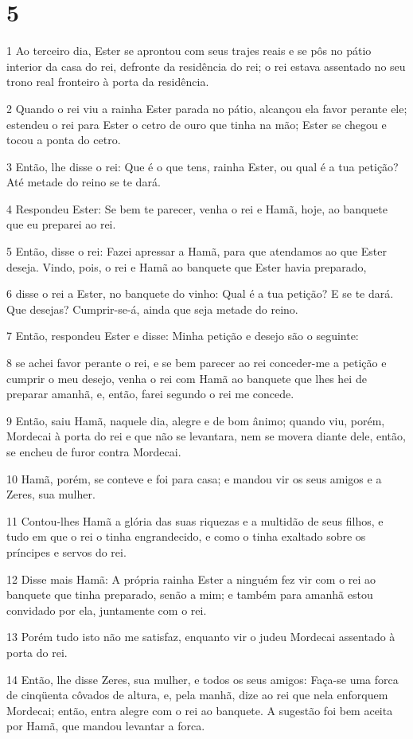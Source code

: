 \chapter{5}

\par 1 Ao terceiro dia, Ester se aprontou com seus trajes reais e se pôs no pátio interior da casa do rei, defronte da residência do rei; o rei estava assentado no seu trono real fronteiro à porta da residência.
\par 2 Quando o rei viu a rainha Ester parada no pátio, alcançou ela favor perante ele; estendeu o rei para Ester o cetro de ouro que tinha na mão; Ester se chegou e tocou a ponta do cetro.
\par 3 Então, lhe disse o rei: Que é o que tens, rainha Ester, ou qual é a tua petição? Até metade do reino se te dará.
\par 4 Respondeu Ester: Se bem te parecer, venha o rei e Hamã, hoje, ao banquete que eu preparei ao rei.
\par 5 Então, disse o rei: Fazei apressar a Hamã, para que atendamos ao que Ester deseja. Vindo, pois, o rei e Hamã ao banquete que Ester havia preparado,
\par 6 disse o rei a Ester, no banquete do vinho: Qual é a tua petição? E se te dará. Que desejas? Cumprir-se-á, ainda que seja metade do reino.
\par 7 Então, respondeu Ester e disse: Minha petição e desejo são o seguinte:
\par 8 se achei favor perante o rei, e se bem parecer ao rei conceder-me a petição e cumprir o meu desejo, venha o rei com Hamã ao banquete que lhes hei de preparar amanhã, e, então, farei segundo o rei me concede.
\par 9 Então, saiu Hamã, naquele dia, alegre e de bom ânimo; quando viu, porém, Mordecai à porta do rei e que não se levantara, nem se movera diante dele, então, se encheu de furor contra Mordecai.
\par 10 Hamã, porém, se conteve e foi para casa; e mandou vir os seus amigos e a Zeres, sua mulher.
\par 11 Contou-lhes Hamã a glória das suas riquezas e a multidão de seus filhos, e tudo em que o rei o tinha engrandecido, e como o tinha exaltado sobre os príncipes e servos do rei.
\par 12 Disse mais Hamã: A própria rainha Ester a ninguém fez vir com o rei ao banquete que tinha preparado, senão a mim; e também para amanhã estou convidado por ela, juntamente com o rei.
\par 13 Porém tudo isto não me satisfaz, enquanto vir o judeu Mordecai assentado à porta do rei.
\par 14 Então, lhe disse Zeres, sua mulher, e todos os seus amigos: Faça-se uma forca de cinqüenta côvados de altura, e, pela manhã, dize ao rei que nela enforquem Mordecai; então, entra alegre com o rei ao banquete. A sugestão foi bem aceita por Hamã, que mandou levantar a forca.

